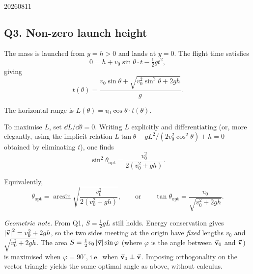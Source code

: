 \begin{solution}{20260811}
\subsection*{Q3.  Non-zero launch height}

The mass is launched from $y = h > 0$ and lands at $y = 0$.  The flight time
satisfies
\[
0 = h + v_{0}\sin\theta \cdot t - \tfrac{1}{2}gt^{2},
\]
giving
\[
t(\theta) = \frac{v_{0}\sin\theta
                + \sqrt{v_{0}^{2}\sin^{2}\theta + 2gh}}{g}.
\]

The horizontal range is $L(\theta) = v_{0}\cos\theta \cdot t(\theta)$.

To maximise $L$, set $\dd L/\dd\theta = 0$.  Writing $L$ explicitly and
differentiating (or, more elegantly, using the implicit relation
$L\tan\theta - gL^{2}/(2v_{0}^{2}\cos^{2}\theta) + h = 0$ obtained by
eliminating $t$), one finds
\[
\boxed{\sin^{2}\theta_{\text{opt}}
       = \frac{v_{0}^{2}}{2(v_{0}^{2} + gh)}}.
\]

Equivalently,
\[
\theta_{\text{opt}} = \arcsin\sqrt{\frac{v_{0}^{2}}{2(v_{0}^{2}+gh)}},
\qquad\text{or}\qquad
\tan\theta_{\text{opt}} = \frac{v_{0}}{\sqrt{v_{0}^{2} + 2gh}}.
\]

\medskip
\noindent\textit{Geometric note.}
From Q1, $S = \tfrac{1}{2}gL$ still holds.  Energy conservation gives
$\left\lvert \vec{\mathbf{v}} \right\rvert^{2} = v_{0}^{2} + 2gh$, so the two sides meeting at the origin
have \emph{fixed} lengths $v_{0}$ and $\sqrt{v_{0}^{2}+2gh}$.
The area $S = \tfrac{1}{2}v_{0}\left\lvert \vec{\mathbf{v}} \right\rvert\sin\varphi$ (where $\varphi$
is the angle between $\vec{\mathbf{v}}_{0}$ and $\vec{\mathbf{v}}$) is maximised when
$\varphi = 90^{\circ}$, i.e.\ when $\vec{\mathbf{v}}_{0} \perp \vec{\mathbf{v}}$.
Imposing orthogonality on the vector triangle yields the same optimal angle
as above, without calculus.

\end{solution}


